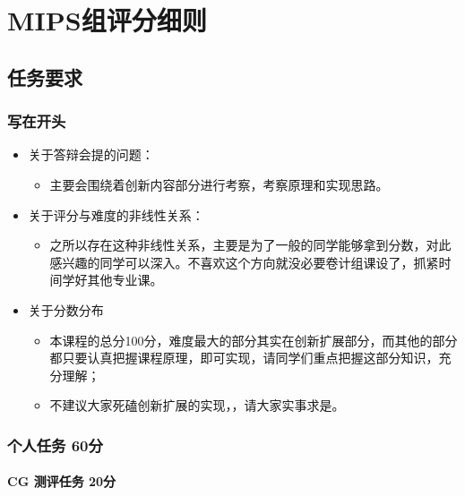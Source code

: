 \section{MIPS组评分细则}

\subsection{任务要求}

\subsubsection{写在开头}


\begin{itemize}
    \item 关于答辩会提的问题：
    \begin{itemize}
        \item 主要会围绕着创新内容部分进行考察，考察原理和实现思路。
    \end{itemize}
    \item 关于评分与难度的非线性关系：
    \begin{itemize}
        \item 之所以存在这种非线性关系，主要是为了一般的同学能够拿到分数，对此感兴趣的同学可以深入。不喜欢这个方向就没必要卷计组课设了，抓紧时间学好其他专业课。
    \end{itemize}
    \item 关于分数分布
    \begin{itemize}
        \item 本课程的总分100分，难度最大的部分其实在创新扩展部分，而其他的部分都只要认真把握课程原理，即可实现，请同学们重点把握这部分知识，充分理解；
        \item 不建议大家死磕创新扩展的实现，，请大家实事求是。
    \end{itemize}
\end{itemize}

\subsubsection{个人任务 60分}

\paragraph{CG 测评任务 20分}

